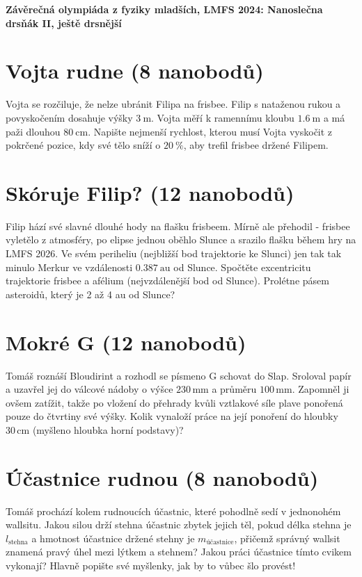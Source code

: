 \documentclass[10pt,a4paper,landscape]{article}
\author{Tomáš Dolák}
\begin{document}
\pagestyle{empty}
	\textbf{\center\LARGE Závěrečná olympiáda z fyziky mladších, LMFS 2024: Nanoslečna drsňák II, ještě drsnější}
\vfill

\begin{multicols}{2}[]

\section{Vojta rudne (8 nanobodů)}
Vojta se rozčiluje, že nelze ubránit Filipa na frisbee. Filip s nataženou rukou a povyskočením dosahuje výšky $3~\mathrm{m}$. Vojta měří k ramennímu kloubu $1.6~\mathrm{m}$ a má paži dlouhou $80~\mathrm{cm}$. Napište nejmenší rychlost, kterou musí Vojta vyskočit z pokrčené pozice, kdy své tělo sníží o $20~\%$, aby trefil frisbee držené Filipem.

\section{Skóruje Filip? (12 nanobodů)}
Filip hází své slavné dlouhé hody na flašku frisbeem. Mírně ale přehodil - frisbee vyletělo z atmosféry, po elipse jednou oběhlo Slunce a srazilo flašku během hry na LMFS 2026. Ve svém periheliu (nejbližší bod trajektorie ke Slunci) jen tak tak minulo Merkur ve vzdálenosti $0.387~\mathrm{au}$ od Slunce. Spočtěte excentricitu trajektorie frisbee a afélium (nejvzdálenější bod od Slunce). Prolétne pásem asteroidů, který je 2 až 4 au od Slunce?



\section{Mokré G (12 nanobodů)}
Tomáš roznáší Bloudirint a rozhodl se písmeno G schovat do Slap. Sroloval papír a uzavřel jej do válcové nádoby o výšce $230\,\mathrm{mm}$ a průměru $100\,\mathrm{mm}$. Zapomněl ji ovšem zatížit, takže po vložení do přehrady kvůli vztlakové síle plave ponořená pouze do čtvrtiny své výšky. Kolik vynaloží práce na její ponoření do hloubky $30\,\mathrm{cm}$ (myšleno hloubka horní podstavy)?

\section{Účastnice rudnou (8 nanobodů)}
Tomáš prochází kolem rudnoucích účastnic, které pohodlně sedí v jednonohém wallsitu. Jakou silou drží stehna účastnic zbytek jejich těl, pokud délka stehna je $l_\text{stehna}$ a hmotnost účastnice držené stehny je $m_\text{účastnice}$, přičemž správný wallsit znamená pravý úhel mezi lýtkem a stehnem? Jakou práci účastnice tímto cvikem vykonají? Hlavně popište své myšlenky, jak by to vůbec šlo provést!


\end{multicols}
\end{document}

